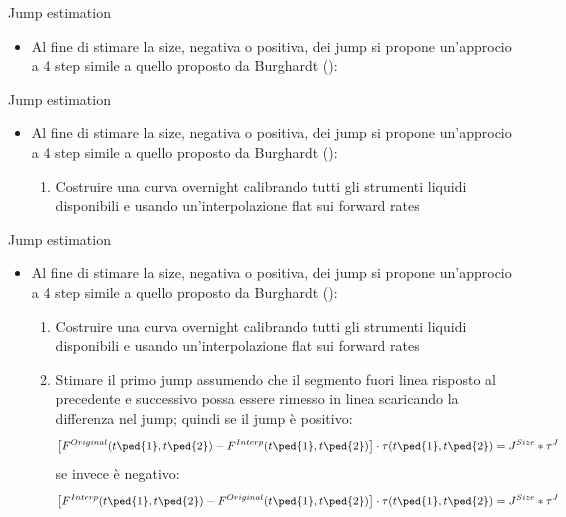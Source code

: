 \begin{tframe}{Jump estimation}
\begin{itemize}
\item Al fine di stimare la size, negativa o positiva, dei jump si propone un'approcio a 4 step simile a quello proposto da Burghardt (\cite{burgh}):
\end{itemize}
\end{tframe}
\begin{tframe}{Jump estimation}
\begin{itemize}
\item Al fine di stimare la size, negativa o positiva, dei jump si propone un'approcio a 4 step simile a quello proposto da Burghardt (\cite{burgh}):
   \begin{enumerate}
   \item Costruire una curva overnight calibrando tutti gli strumenti liquidi disponibili e usando un'interpolazione flat sui forward rates
   \end{enumerate}
\end{itemize}
\end{tframe}
\begin{tframe}{Jump estimation}
\begin{itemize}
\item Al fine di stimare la size, negativa o positiva, dei jump si propone un'approcio a 4 step simile a quello proposto da Burghardt (\cite{burgh}):
   \begin{enumerate}
   \item Costruire una curva overnight calibrando tutti gli strumenti liquidi disponibili e usando un'interpolazione flat sui forward rates
   \item Stimare il primo jump assumendo che il segmento fuori linea risposto al precedente e successivo possa essere rimesso in linea scaricando la differenza nel jump; quindi se il jump è positivo:
   $$\left[F^{Original}(t\ped{1},t\ped{2}) - F^{Interp}(t\ped{1},t\ped{2})\right] \cdot \tau(t\ped{1},t\ped{2}) = J^{Size}*\tau^{J}$$
   se invece è negativo:
   $$\left[F^{Interp}(t\ped{1},t\ped{2}) - F^{Original}(t\ped{1},t\ped{2})\right] \cdot \tau(t\ped{1},t\ped{2}) = J^{Size}*\tau^{J}$$
   \end{enumerate}
\end{itemize}
\end{tframe}
